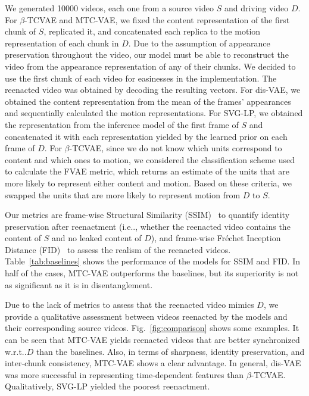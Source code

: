 \documentclass[journal]{IEEEtran}
\makeatletter
\DeclareRobustCommand\onedot{\futurelet\@let@token\@onedot}
\def\@onedot{\ifx\@let@token.\else.\null\fi\xspace}
\def\ie{{i.e}\onedot} \def\Ie{{I.e}\onedot}
\def\wrt{w.r.t\onedot} \def\dof{d.o.f\onedot}
\makeatother
\begin{document}
We generated \num{10000} videos, each one from a source video $S$ and driving video $D$.
For $\beta$-TCVAE and MTC-VAE, we fixed the content representation of the first chunk of $S$, replicated it, and concatenated each replica to the motion representation of each chunk in $D$\@.
Due to the assumption of appearance preservation throughout the video, our model must be able to reconstruct the video from the appearance representation of any of their chunks.
We decided to use the first chunk of each video for easinesses in the implementation.
The reenacted video was obtained by decoding the resulting vectors.
For dis-VAE, we obtained the content representation from the mean of the frames' appearances and sequentially calculated the motion representations.
For SVG-LP, we obtained the representation from the inference model of the first frame of $S$ and concatenated it with each representation yielded by the learned prior on each frame of $D$.
For $\beta$-TCVAE, since we do not know which units correspond to content and which ones to motion, we considered the classification scheme used to calculate the FVAE metric, which returns an estimate of the units that are more likely to represent either content and motion.
Based on these criteria, we swapped the units that are more likely to represent motion from $D$ to $S$.

Our metrics are frame-wise Structural Similarity (SSIM)~\cite{Wang2004} to quantify identity preservation after reenactment (\ie, whether the reenacted video contains the content of $S$ and no leaked content of $D$), and frame-wise Fréchet Inception Distance (FID)~\cite{Heusel2017} to assess the realism of the reenacted videos.
Table~\ref{tab:baselines} shows the performance of the models for SSIM and FID\@.
In half of the cases, MTC-VAE outperforms the baselines, but its superiority is not as significant as it is in disentanglement.

Due to the lack of metrics to assess that the reenacted video mimics $D$, we provide a qualitative assessment between videos reenacted by the models and their corresponding source videos.
Fig.~\ref{fig:comparison} shows some examples.
It can be seen that MTC-VAE yields reenacted videos that are better synchronized \wrt $D$ than the baselines.
Also, in terms of sharpness, identity preservation, and inter-chunk consistency, MTC-VAE shows a clear advantage.
In general, dis-VAE was more successful in representing time-dependent features than $\beta$-TCVAE\@.
Qualitatively, SVG-LP yielded the poorest reenactment.
\end{document}
